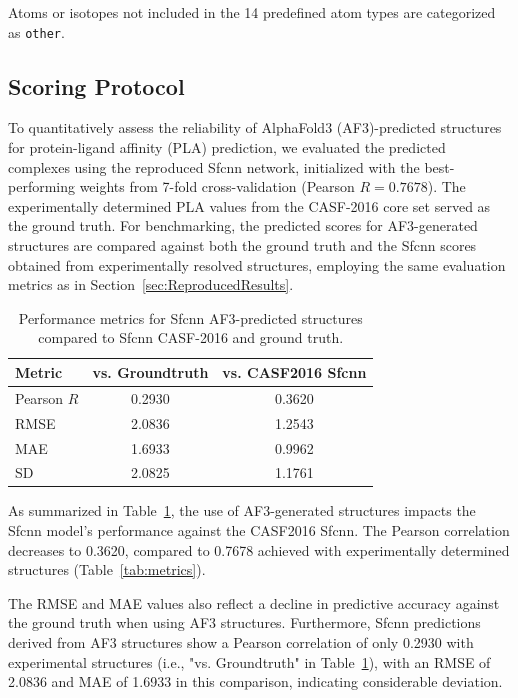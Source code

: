 \documentclass[unnumsec,webpdf,contemporary,large]{oup-authoring-template}
\theoremstyle{thmstyleone}%
\theoremstyle{thmstyletwo}%
\theoremstyle{thmstylethree}%
\begin{document}
Atoms or isotopes not included in the 14 predefined atom types are 
categorized as \texttt{other}.

\subsection{Scoring Protocol}
To quantitatively assess the reliability of AlphaFold3 (AF3)-predicted structures 
for protein-ligand affinity (PLA) prediction, we evaluated the predicted complexes 
using the reproduced Sfcnn network, initialized with the best-performing weights from 
7-fold cross-validation (Pearson $R = 0.7678$). The experimentally determined PLA values from the 
CASF-2016 core set served as the ground truth. 
For benchmarking, the predicted scores for AF3-generated structures are compared 
against both the ground truth and the Sfcnn scores obtained from experimentally 
resolved structures, employing the same evaluation metrics as 
in Section~\ref{sec:ReproducedResults}.

\begin{table}[H]
\centering
\caption{Performance metrics for Sfcnn AF3-predicted structures compared to Sfcnn CASF-2016 and ground truth.}
\label{tab:af3_metrics}
\begin{tabular}{lcc}
\toprule
Metric & vs. Groundtruth & vs.  CASF2016 Sfcnn\\
\midrule
Pearson $R$ & 0.2930 & 0.3620 \\
RMSE        & 2.0836 & 1.2543 \\
MAE         & 1.6933 & 0.9962 \\
SD          & 2.0825 & 1.1761 \\
\bottomrule
\end{tabular}
\end{table}

As summarized in Table~\ref{tab:af3_metrics}, 
the use of AF3-generated structures impacts the Sfcnn model's performance against the CASF2016 Sfcnn. 
The Pearson correlation decreases to 0.3620, compared to 0.7678 achieved with experimentally determined structures (Table~\ref{tab:metrics}). 

The RMSE and MAE values also reflect a decline in predictive accuracy against the ground truth when using AF3 structures. 
Furthermore, Sfcnn predictions derived from AF3 structures show a Pearson correlation of only 0.2930 
with experimental structures (i.e., "vs. Groundtruth" in Table~\ref{tab:af3_metrics}), 
with an RMSE of 2.0836 and MAE of 1.6933 in this comparison, indicating considerable deviation.
\end{document}
